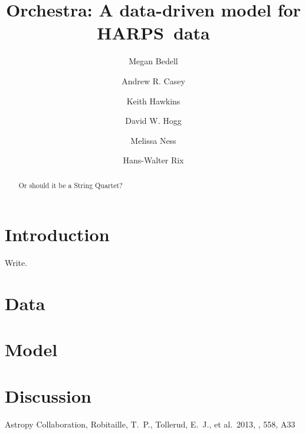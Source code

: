 \documentclass{aastex61}
\newcommand{\acronym}[1]{{\small{#1}}}
\newcommand{\harps}{\acronym{HARPS}}
\begin{document}
\title{Orchestra: A data-driven model for \harps\ data}


\author{Megan Bedell}
\author[0000-0003-0174-0564]{Andrew R. Casey}
\author{Keith Hawkins}
\author{David W. Hogg}
\author{Melissa Ness}
\author{Hans-Walter Rix}



\begin{abstract}
Or should it be a String Quartet?
\end{abstract}

\keywords{}

\section{Introduction} 
\label{sec:introduction}
Write.


\section{Data}
\label{sec:observations}


\section{Model}
\label{sec:model}



\section{Discussion}
\label{sec:discussion}


\acknowledgments



\begin{thebibliography}{}

 Astropy Collaboration, Robitaille, T.~P., Tollerud, E.~J., et al.\ 2013, \aap, 558, A33 

\end{thebibliography}
\end{document}
